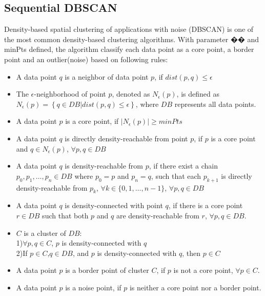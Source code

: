 \documentclass[letterpaper,twocolumn,10pt]{article}
\begin{document}
\subsection{Sequential DBSCAN}
\quad Density-based spatial clustering of applications with noise (DBSCAN) is one of the most common density-based clustering algorithms. With parameter �� and minPts defined, the algorithm classify each data point as a core point, a border point and an outlier(noise) based on following rules:
\begin{itemize}
\item A data point $q$ is a neighbor of data point $p$, if $dist(p,q)\le \epsilon$
\item The $\epsilon$-neighborhood of point $p$, denoted as $N_{\epsilon}\left(p\right)$, is defined as $N_{\epsilon}\left(p\right) = \left\{q \in DB|dist(p,q) \le \epsilon\right\}$, where $DB$ represents all data points.
\item A data point $p$ is a core point, if $|N_{\epsilon}\left(p\right)| \geq minPts$
\item A data point $q$ is directly density-reachable from point $p$, if $p$ is a core point and $q\in N_{\epsilon}\left(p\right)$, $\forall p,q \in DB$
\item A data point $q$ is density-reachable from $p$, if there exist a chain $p_0,p_1,\dots,p_n \in DB$ where $p_0 = p$ and $p_n = q$, such that each $p_{k+1}$ is directly density-reachable from $p_k$, $\forall k \in \{0,1,\dots,n-1\}$, $\forall p,q \in DB$
\item A data point $q$ is density-connected with point $q$, if there is a core point $r \in DB$ such that both $p$ and $q$ are density-reachable from $r$, $\forall p,q \in DB$.
\item $C$ is a cluster of $DB$:\\
1)\quad $\forall p,q \in C$, $p$ is density-connected with $q$\\
2)\quad If $p\in C$,$q\in DB$, and $p$ is density-connected with $q$, then $p\in C$
\item A data point $p$ is a border point of cluster $C$, if $p$ is not a core point, $\forall p \in C$.
\item A data point $p$ is a noise point, if $p$ is neither a core point nor a border point.
\end{itemize}
\end{document}
